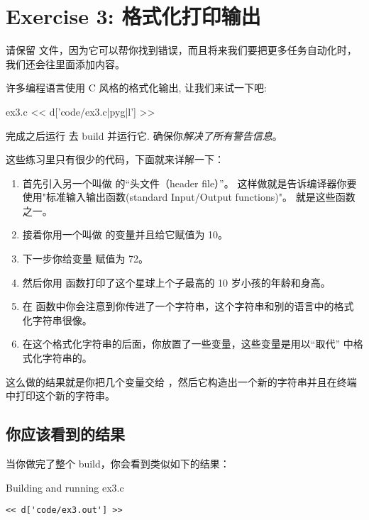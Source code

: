\chapter{Exercise 3: 格式化打印输出}

请保留   文件，因为它可以帮你找到错误，而且将来我们要把更多任务自动化时，我们还会往里面添加内容。

许多编程语言使用 C 风格的格式化输出, 让我们来试一下吧:

\begin{code}{ex3.c}
<< d['code/ex3.c|pyg|l'] >>
\end{code}

完成之后运行  去 build 并运行它. 
确保你\emph{解决了所有警告信息}。

这些练习里只有很少的代码，下面就来详解一下：

\begin{enumerate}
\item 首先引入另一个叫做  的“头文件（header file）”。 这样做就是告诉编译器你要使用"标准输入输出函数(standard Input/Output functions)"。 就是这些函数之一。
\item 接着你用一个叫做  的变量并且给它赋值为 10。
\item 下一步你给变量  赋值为 72。
\item 然后你用  函数打印了这个星球上个子最高的 10  岁小孩的年龄和身高。
\item 在  函数中你会注意到你传进了一个字符串，这个字符串和别的语言中的格式化字符串很像。
\item 在这个格式化字符串的后面，你放置了一些变量，这些变量是用以“取代”  中格式化字符串的。
\end{enumerate}

这么做的结果就是你把几个变量交给 ，然后它构造出一个新的字符串并且在终端中打印这个新的字符串。

\section{你应该看到的结果}

当你做完了整个 build，你会看到类似如下的结果：

\begin{Terminal}{Building and running ex3.c}
\begin{lstlisting}
<< d['code/ex3.out'] >>
\end{lstlisting}
\end{Terminal}

